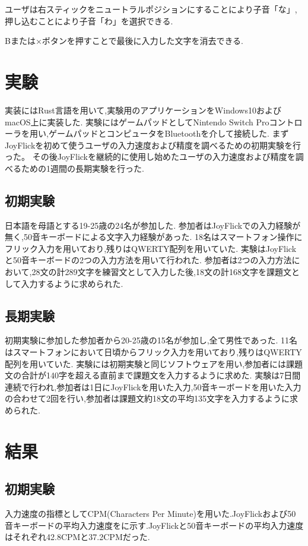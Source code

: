 \documentclass[uplatex]{jsarticle}
\begin{document}
ユーザは右スティックをニュートラルポジションにすることにより子音「な」,押し込むことにより子音「わ」を選択できる.

Bまたは×ボタンを押すことで最後に入力した文字を消去できる.

\section{実験}
実装にはRust言語を用いて,実験用のアプリケーションをWindows10およびmacOS上に実装した.
実験にはゲームパッドとしてNintendo Switch Proコントローラを用い,ゲームパッドとコンピュータをBluetoothを介して接続した.
まずJoyFlickを初めて使うユーザの入力速度および精度を調べるための初期実験を行った。
その後JoyFlickを継続的に使用し始めたユーザの入力速度および精度を調べるための1週間の長期実験を行った.

\subsection{初期実験}
日本語を母語とする19-25歳の24名が参加した.
参加者はJoyFlickでの入力経験が無く,50音キーボードによる文字入力経験があった.
18名はスマートフォン操作にフリック入力を用いており,残りはQWERTY配列を用いていた.
実験はJoyFlickと50音キーボードの2つの入力方法を用いて行われた.
参加者は2つの入力方法において,28文の計289文字を練習文として入力した後,18文の計168文字を課題文として入力するように求められた.

\subsection{長期実験}
初期実験に参加した参加者から20-25歳の15名が参加し,全て男性であった.
11名はスマートフォンにおいて日頃からフリック入力を用いており,残りはQWERTY配列を用いていた.
実験には初期実験と同じソフトウェアを用い,参加者には課題文の合計が140字を超える直前まで課題文を入力するように求めた.
実験は7日間連続で行われ,参加者は1日にJoyFlickを用いた入力,50音キーボードを用いた入力の合わせて2回を行い,参加者は課題文約18文の平均135文字を入力するように求められた.




\section{結果}
\subsection{初期実験}
入力速度の指標としてCPM(Characters Per Minute)を用いた.JoyFlickおよび50音キーボードの平均入力速度をに示す.JoyFlickと50音キーボードの平均入力速度はそれぞれ42.8CPMと37.2CPMだった.
\end{document}
